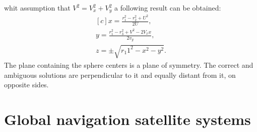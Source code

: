 whit assumption that $V^{2} = V_{x}^{2} + V_{y}^{2}$ a following result can be obtained:
\begin{equation}
	\label{equ:three_point_pyt}
	\begin{aligned}[c]
		x = \frac{r_{1}^{2}-r_{2}^{2}+U^{2}}{2U},\\
		y = \frac{r_{1}^{2}-r_{3}^{2}+V^{2}-2V_{x}x}{2v_{y}},\\
		z = \pm \sqrt{r_1{1}^{2}-x^{2}-y^{2}}.
	\end{aligned}
\end{equation}
The plane containing the sphere centers is a plane of symmetry.
The correct and ambiguous solutions are perpendicular to it and equally distant from it, 
on opposite sides.

\section{Global navigation satellite systems}

